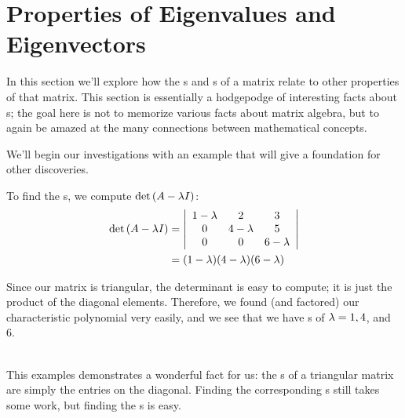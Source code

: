 \section{Properties of Eigenvalues and Eigenvectors}\label{sec:eigen_prop}


In this section we'll explore how the \el s and \ev s of a matrix relate to other properties of that matrix. This section is essentially a hodgepodge of interesting facts about \el s; the goal here is not to memorize various facts about matrix algebra, but to again be amazed at the many connections between mathematical concepts.

We'll begin our investigations with an example that will give a foundation for other discoveries.\\

{To find the \el s, we compute $\det{\tta-\lda\tti}$:
\begin{align*}
\det{\tta-\lda\tti}	&=	\bdt{ccc} 1-\lda & 2&3\\0&4-\lda&5\\0&0&6-\lda \edt\\
										&= (1-\lda)(4-\lda)(6-\lda)
\end{align*}

Since our matrix is triangular, the determinant is easy to compute; it is just the product of the diagonal elements. Therefore, we found (and factored) our characteristic polynomial very easily, and we see that we have \el s of $\lda = 1, 4$, and 6.}\\ %

This examples demonstrates a wonderful fact for us: the \el s of a triangular matrix are simply the entries on the diagonal. Finding the corresponding \ev s still takes some work, but finding the \el s is easy.

